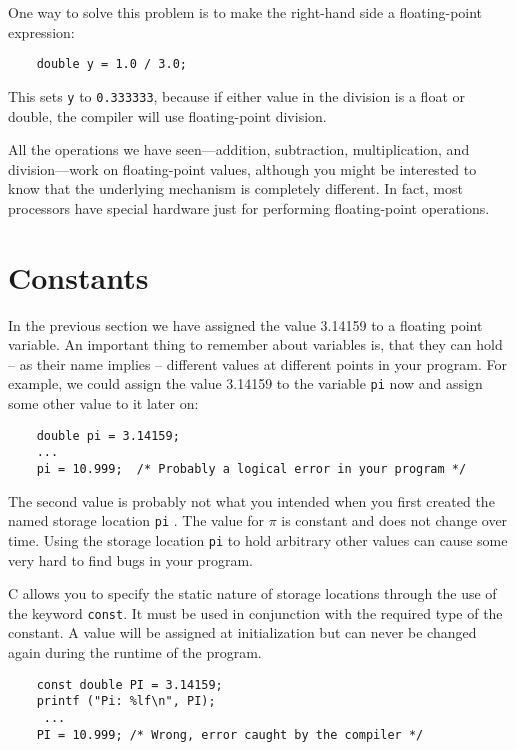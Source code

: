 
One way to solve this problem is to make the right-hand side a floating-point
expression:

\begin{verbatim}
    double y = 1.0 / 3.0;
\end{verbatim}
%
This sets {\tt y} to {\tt 0.333333}, because if either value in the division is a float or double, the compiler will use floating-point division.


All the operations we have seen---addition, subtraction,
multiplication, and division---work on floating-point values,
although you might be interested to know that the underlying mechanism
is completely different.  In fact, most processors have special
hardware just for performing floating-point operations.

\section{Constants}
\label{sec:Constants}

In the previous section we have assigned the value 3.14159 to a
floating point variable. An important thing to remember about variables
is, that they can hold -- as their name implies -- 
different values at different points in your program. 
For example, we could assign
the value 3.14159 to the variable {\tt pi} now and assign 
some other value to it later on:

\begin{verbatim}
    double pi = 3.14159;
    ...
    pi = 10.999;  /* Probably a logical error in your program */
\end{verbatim}
%

The second value is probably not what you intended when you first created the named
storage location {\tt pi} . The value for $\pi$ is  constant and does not
change over time. Using the storage location {\tt pi} to hold arbitrary other values can 
cause some very hard to find bugs in your program.

C allows you to specify the static nature of storage locations through
the use of the keyword {\tt const}. It must be used in conjunction with the 
required type of the constant. A value will be assigned at initialization but can
never be changed again during the runtime of the program.  

\begin{verbatim}
    const double PI = 3.14159;
    printf ("Pi: %lf\n", PI);
     ...
    PI = 10.999; /* Wrong, error caught by the compiler */
\end{verbatim}
%

